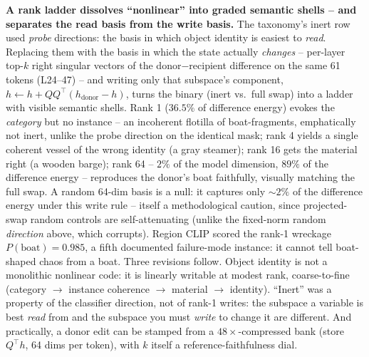 \documentclass[10pt,twocolumn]{article}
\begin{document}
\textbf{A rank ladder dissolves ``nonlinear'' into graded semantic
shells -- and separates the read basis from the write basis.} The
taxonomy's inert row used \emph{probe} directions: the basis in which
object identity is easiest to \emph{read}. Replacing them with the
basis in which the state actually \emph{changes} -- per-layer top-$k$
right singular vectors of the donor$-$recipient difference on the same
61 tokens (L24--47) -- and writing only that subspace's component,
$h \leftarrow h + QQ^{\top}(h_{\text{donor}} - h)$, turns the binary
(inert vs.\ full swap) into a ladder with visible semantic shells.
Rank 1 ($36.5\%$ of difference energy) evokes the \emph{category} but
no instance -- an incoherent flotilla of boat-fragments, emphatically
not inert, unlike the probe direction on the identical mask; rank 4
yields a single coherent vessel of the wrong identity (a gray
steamer); rank 16 gets the material right (a wooden barge); rank 64 --
$2\%$ of the model dimension, $89\%$ of the difference energy --
reproduces the donor's boat faithfully, visually matching the full
swap. A random 64-dim basis is a null: it captures only ${\sim}2\%$ of
the difference energy under this write rule -- itself a methodological
caution, since projected-swap random controls are self-attenuating
(unlike the fixed-norm random \emph{direction} above, which corrupts).
Region CLIP scored the rank-1 wreckage $P(\text{boat}){=}0.985$, a
fifth documented failure-mode instance: it cannot tell boat-shaped
chaos from a boat. Three revisions follow. Object identity is not a
monolithic nonlinear code: it is linearly writable at modest rank,
coarse-to-fine (category $\to$ instance coherence $\to$ material $\to$
identity). ``Inert'' was a property of the classifier direction, not
of rank-1 writes: the subspace a variable is best \emph{read} from and
the subspace you must \emph{write} to change it are different. And
practically, a donor edit can be stamped from a $48\times$-compressed
bank (store $Q^{\top}h$, 64 dims per token), with $k$ itself a
reference-faithfulness dial.
\end{document}
